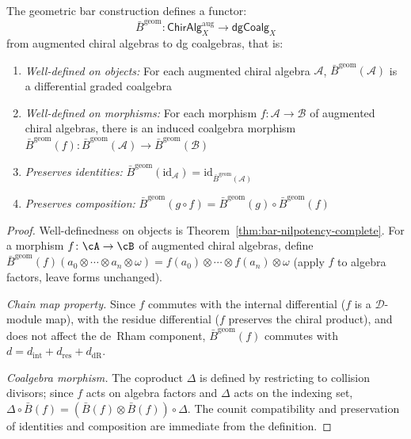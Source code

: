 \begin{theorem}\label{thm:bar-functorial-complete}
\label{thm:bar-functorial}
The geometric bar construction defines a functor:
\[\bar{B}^{\text{geom}}: \mathsf{ChirAlg}_X^{\mathrm{aug}} \to \mathsf{dgCoalg}_X\]
from augmented chiral algebras to dg coalgebras, that is:
\begin{enumerate}
\item \emph{Well-defined on objects:} For each augmented chiral algebra $\mathcal{A}$, $\bar{B}^{\text{geom}}(\mathcal{A})$ is a differential graded coalgebra
\item \emph{Well-defined on morphisms:} For each morphism $f: \mathcal{A} \to \mathcal{B}$ of augmented chiral algebras, there is an induced coalgebra morphism $\bar{B}^{\text{geom}}(f): \bar{B}^{\text{geom}}(\mathcal{A}) \to \bar{B}^{\text{geom}}(\mathcal{B})$
\item \emph{Preserves identities:} $\bar{B}^{\text{geom}}(\text{id}_\mathcal{A}) = \text{id}_{\bar{B}^{\text{geom}}(\mathcal{A})}$
\item \emph{Preserves composition:} $\bar{B}^{\text{geom}}(g \circ f) = \bar{B}^{\text{geom}}(g) \circ \bar{B}^{\text{geom}}(f)$
\end{enumerate}
\end{theorem}

\begin{proof}
Well-definedness on objects is
Theorem~\ref{thm:bar-nilpotency-complete}.
For a morphism $f\colon \cA \to \cB$ of augmented chiral
algebras, define
$\bar{B}^{\mathrm{geom}}(f)(a_0 \otimes \cdots \otimes a_n
\otimes \omega) = f(a_0) \otimes \cdots \otimes f(a_n) \otimes
\omega$\label{def:bar-induced-map}
(apply $f$ to algebra factors, leave forms unchanged).

\emph{Chain map property.}\label{lem:bar-induced-chain-map}
Since $f$ commutes with the internal differential ($f$ is a
$\mathcal{D}$-module map), with the residue differential ($f$
preserves the chiral product), and does not affect the de~Rham
component, $\bar{B}^{\mathrm{geom}}(f)$ commutes with
$d = d_{\mathrm{int}} + d_{\mathrm{res}} + d_{\mathrm{dR}}$.

\emph{Coalgebra morphism.}\label{lem:bar-induced-coalgebra}
The coproduct $\Delta$ is defined by restricting to collision
divisors; since $f$ acts on algebra factors and $\Delta$ acts
on the indexing set,
$\Delta \circ \bar{B}(f) = (\bar{B}(f) \otimes \bar{B}(f))
\circ \Delta$.  The counit compatibility and preservation of
identities and composition are immediate from the definition.
\end{proof}


